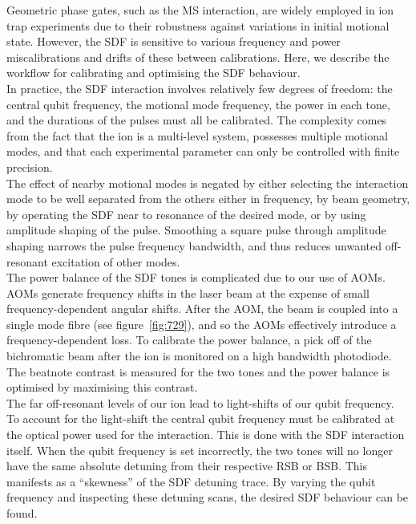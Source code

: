     Geometric phase gates, such as the MS interaction, are widely employed in ion trap experiments due to their robustness against variations in initial motional state. However, the SDF is sensitive to various frequency and power miscalibrations and drifts of these between calibrations.  Here, we describe the workflow for calibrating and optimising the SDF behaviour.\\
    In practice, the SDF interaction involves relatively few degrees of freedom: the central qubit frequency, the motional mode frequency, the power in each tone, and the durations of the pulses must all be calibrated. The complexity comes from the fact that the ion is a multi-level system, possesses multiple motional modes, and that each experimental parameter can only be controlled with finite precision.\\
    The effect of nearby motional modes is negated by either selecting the
    interaction mode to be well separated from the others either in frequency, by beam geometry, by
    operating the SDF near to resonance of the desired mode, or by using amplitude shaping of the pulse.
    Smoothing a square pulse through amplitude shaping narrows the pulse frequency bandwidth, and thus reduces unwanted off-resonant
    excitation of other modes.  \\
    The power balance of the SDF tones is complicated due to our use of AOMs.
    AOMs generate frequency shifts in the laser beam at the expense of small
    frequency-dependent angular shifts. After the AOM, the beam is coupled into a
    single mode fibre (see figure~\ref{fig:729}), and so the AOMs effectively introduce a
    frequency-dependent loss. To calibrate the power balance, a pick
    off of the bichromatic beam after the ion is monitored on a high bandwidth photodiode.
    The beatnote contrast is measured for the two tones and the power
    balance is optimised by maximising this contrast.\\
    The far off-resonant levels of our ion lead to light-shifts of our qubit
    frequency. To account for the light-shift the central qubit frequency must be calibrated at the
    optical power used for the interaction. This is done with the SDF interaction
    itself. When the qubit frequency is set incorrectly, the two tones will no
    longer have the same absolute detuning from their respective RSB or BSB.
    This manifests as a ``skewness'' of the SDF detuning trace. By varying the qubit frequency and
    inspecting these detuning scans, the desired SDF behaviour can be found. \\
